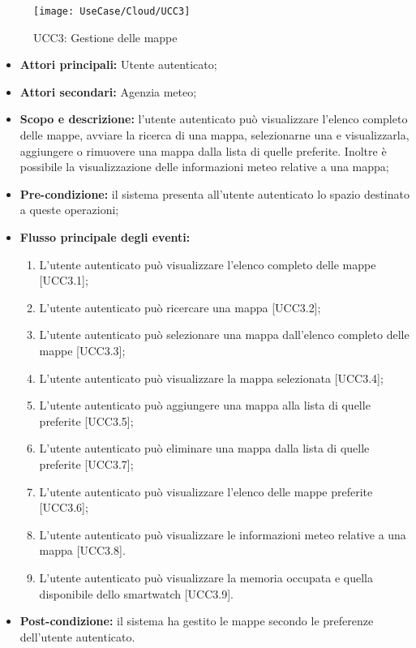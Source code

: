 \begin{figure}[H]
\centering
\texttt{[image: UseCase/Cloud/UCC3]}
\caption{UCC3: Gestione delle mappe}
\end{figure}

\begin{itemize}
\item \textbf{Attori principali:} Utente autenticato;
\item \textbf{Attori secondari:} Agenzia meteo;
\item \textbf{Scopo e descrizione:} l'utente autenticato può visualizzare l'elenco completo delle mappe, avviare la ricerca di una mappa, selezionarne una e visualizzarla, aggiungere o rimuovere una mappa dalla lista di quelle preferite. Inoltre è possibile la visualizzazione delle informazioni meteo relative a una mappa;
\item \textbf{Pre-condizione:} il sistema presenta all'utente autenticato lo spazio destinato a queste operazioni;
\item \textbf{Flusso principale degli eventi:}
\begin{enumerate}
\item L'utente autenticato può visualizzare l'elenco completo delle mappe [UCC3.1];
\item L'utente autenticato può ricercare una mappa [UCC3.2];
\item L'utente autenticato può selezionare una mappa dall'elenco completo delle mappe [UCC3.3];
\item L'utente autenticato può visualizzare la mappa selezionata [UCC3.4];
\item L'utente autenticato può aggiungere una mappa alla lista di quelle preferite [UCC3.5];
\item L'utente autenticato può eliminare una mappa dalla lista di quelle preferite [UCC3.7];
\item L'utente autenticato può visualizzare l'elenco delle mappe preferite [UCC3.6];
\item L'utente autenticato può visualizzare le informazioni meteo relative a una mappa [UCC3.8].
\item L'utente autenticato può visualizzare la memoria occupata e quella disponibile dello smartwatch [UCC3.9].
\end{enumerate}
\item \textbf{Post-condizione:} il sistema ha gestito le mappe secondo le preferenze dell'utente autenticato.
\end{itemize}

